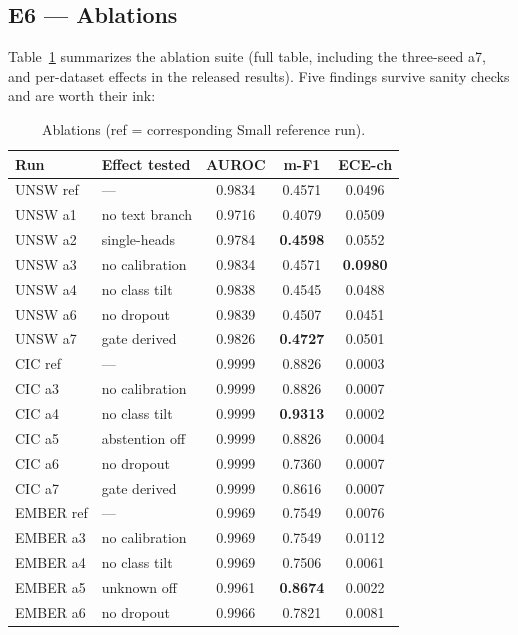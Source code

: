 \documentclass[sigconf,anonymous=false]{acmart}
\begin{document}
\subsection{E6 --- Ablations}
\label{sec:e6}

Table~\ref{tab:e6} summarizes the ablation suite (full table, including the three-seed a7, and per-dataset effects in the released results). Five findings survive sanity checks and are worth their ink:

\begin{table}[t]
\caption{Ablations (ref = corresponding Small reference run).}
\label{tab:e6}
\small
\setlength{\tabcolsep}{4pt}
\begin{tabular}{llccc}
\toprule
Run & Effect tested & AUROC & m-F1 & ECE-ch \\
\midrule
UNSW ref    & ---             & 0.9834 & 0.4571 & 0.0496 \\
UNSW a1     & no text branch  & 0.9716 & 0.4079 & 0.0509 \\
UNSW a2     & single-heads    & 0.9784 & \textbf{0.4598} & 0.0552 \\
UNSW a3     & no calibration  & 0.9834 & 0.4571 & \textbf{0.0980} \\
UNSW a4     & no class tilt   & 0.9838 & 0.4545 & 0.0488 \\
UNSW a6     & no dropout      & 0.9839 & 0.4507 & 0.0451 \\
UNSW a7     & gate derived    & 0.9826 & \textbf{0.4727} & 0.0501 \\
\midrule
CIC ref     & ---             & 0.9999 & 0.8826 & 0.0003 \\
CIC a3      & no calibration  & 0.9999 & 0.8826 & 0.0007 \\
CIC a4      & no class tilt   & 0.9999 & \textbf{0.9313} & 0.0002 \\
CIC a5      & abstention off  & 0.9999 & 0.8826 & 0.0004 \\
CIC a6      & no dropout      & 0.9999 & 0.7360 & 0.0007 \\
CIC a7      & gate derived    & 0.9999 & 0.8616 & 0.0007 \\
\midrule
EMBER ref   & ---             & 0.9969 & 0.7549 & 0.0076 \\
EMBER a3    & no calibration  & 0.9969 & 0.7549 & 0.0112 \\
EMBER a4    & no class tilt   & 0.9969 & 0.7506 & 0.0061 \\
EMBER a5    & unknown off     & 0.9961 & \textbf{0.8674} & 0.0022 \\
EMBER a6    & no dropout      & 0.9966 & 0.7821 & 0.0081 \\
\bottomrule
\end{tabular}
\end{table}
\end{document}
